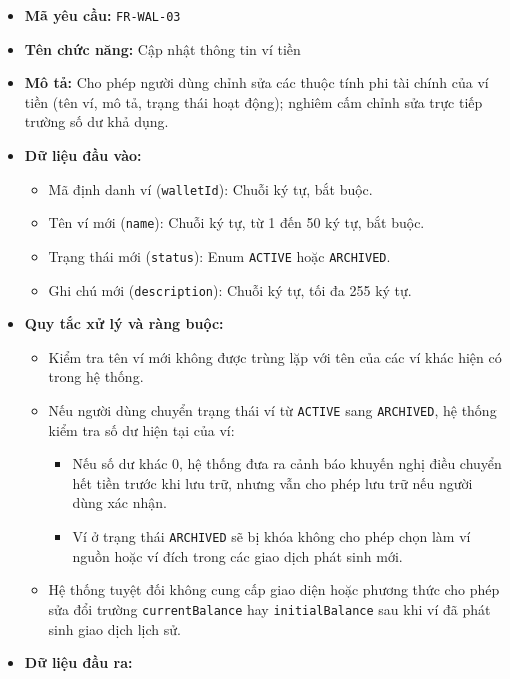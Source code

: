 \documentclass[11pt,a4paper]{article}
\providecommand{\tightlist}{
  \setlength{\itemsep}{0pt}\setlength{\parskip}{0pt}}
\begin{document}
\begin{itemize}
\tightlist
\item
  \textbf{Mã yêu cầu:} \texttt{FR-WAL-03}
\item
  \textbf{Tên chức năng:} Cập nhật thông tin ví tiền
\item
  \textbf{Mô tả:} Cho phép người dùng chỉnh sửa các thuộc tính phi tài
  chính của ví tiền (tên ví, mô tả, trạng thái hoạt động); nghiêm cấm
  chỉnh sửa trực tiếp trường số dư khả dụng.
\item
  \textbf{Dữ liệu đầu vào:}

  \begin{itemize}
  \tightlist
  \item
    Mã định danh ví (\texttt{walletId}): Chuỗi ký tự, bắt buộc.
  \item
    Tên ví mới (\texttt{name}): Chuỗi ký tự, từ 1 đến 50 ký tự, bắt
    buộc.
  \item
    Trạng thái mới (\texttt{status}): Enum \texttt{ACTIVE} hoặc
    \texttt{ARCHIVED}.
  \item
    Ghi chú mới (\texttt{description}): Chuỗi ký tự, tối đa 255 ký tự.
  \end{itemize}
\item
  \textbf{Quy tắc xử lý và ràng buộc:}

  \begin{itemize}
  \tightlist
  \item
    Kiểm tra tên ví mới không được trùng lặp với tên của các ví khác
    hiện có trong hệ thống.
  \item
    Nếu người dùng chuyển trạng thái ví từ \texttt{ACTIVE} sang
    \texttt{ARCHIVED}, hệ thống kiểm tra số dư hiện tại của ví:

    \begin{itemize}
    \tightlist
    \item
      Nếu số dư khác 0, hệ thống đưa ra cảnh báo khuyến nghị điều chuyển
      hết tiền trước khi lưu trữ, nhưng vẫn cho phép lưu trữ nếu người
      dùng xác nhận.
    \item
      Ví ở trạng thái \texttt{ARCHIVED} sẽ bị khóa không cho phép chọn
      làm ví nguồn hoặc ví đích trong các giao dịch phát sinh mới.
    \end{itemize}
  \item
    Hệ thống tuyệt đối không cung cấp giao diện hoặc phương thức cho
    phép sửa đổi trường \texttt{currentBalance} hay
    \texttt{initialBalance} sau khi ví đã phát sinh giao dịch lịch sử.
  \end{itemize}
\item
  \textbf{Dữ liệu đầu ra:}


\end{itemize}
\end{document}
